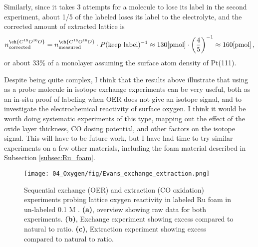 Similarly, since it takes 3 attempts for a  molecule to lose its label in the second experiment, about 1/5 of the labeled  loses its label to the electrolyte, and the corrected amount of extracted lattice  is
\begin{equation}
n^{\ch{C^{18}O^{16}O}}_\text{corrected} = n^{\ch{C^{18}O^{16}O}}_{\text{measured}} \cdot P(\text{keep label})^{-1} \approx 130 \text{[pmol]} \cdot \left(\frac{4}{5}\right)^{-1} \approx 160 \text{[pmol]}\,,
\end{equation}
or about 33\% of a monolayer assuming the surface atom density of Pt(111).

Despite being quite complex, I think that the results above illustrate that using  as a probe molecule in isotope exchange experiments can be very useful, both as an in-situ proof of labeling when OER does not give an isotope signal, and to investigate the electrochemical reactivity of surface oxygen. I think it would be worth doing systematic experiments of this type, mapping out the effect of the oxide layer thickness, CO dosing potential, and other factors on the isotope signal. This will have to be future work, but I have had time to try similar experiments on a few other materials, including the  foam material described in Subsection \ref{subsec:Ru_foam}.

\begin{figure}[h!]
	\centering
	\texttt{[image: 04\_Oxygen/fig/Evans\_exchange\_extraction.png]}
	\caption{Sequential exchange (OER) and extraction (CO oxidation) experiments probing lattice oxygen reactivity in labeled Ru foam in un-labeled 0.1 M .  \textbf{(a)}, overview showing raw data for both experiments. \textbf{(b)}, Exchange experiment showing excess  compared to natural  to  ratio. \textbf{(c)}, Extraction experiment showing excess  compared to natural  to  ratio.
	}
	\label{fig:Evans_extraction}
\end{figure}

